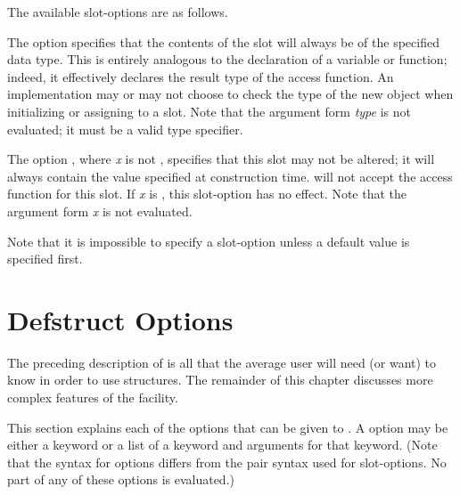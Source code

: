 The available slot-options are as follows.
\begin{flushdesc}
\item[\cd{:type}]
The option  specifies that the contents of the
slot will always be of the specified data type.  This is entirely
analogous to the declaration of a variable or function; indeed, it
effectively declares the result type of the access function.  An
implementation may or may not choose to check the type of the new object
when initializing or assigning to a slot.
Note that the argument form \emph{type} is not evaluated;
it must be a valid type specifier.

\item[\cd{:read-only}]
The option , where \emph{x} is not {\false},
specifies that this slot may not be
altered; it will always contain the value specified at construction time.
 will not accept the access function for this slot.
If \emph{x} is {\false}, this slot-option has no effect.
Note that the argument form \emph{x} is not evaluated.
\end{flushdesc}

Note that it is impossible to specify a slot-option unless
a default value is specified first.

\section{Defstruct Options}
\label{DEFSTRUCT-OPTIONS}
\label{Defstruct-Hairy-Stuff}

The preceding description of  is all that the average
user will need (or want) to know in order to use structures.
The remainder of this chapter discusses more complex features of
the  facility.

This section explains each of the options that can be given to .
A  option may be either a keyword
or a list of a keyword and arguments for that keyword.
(Note that the syntax for  options differs from
the pair syntax used for slot-options.  No part of any of these options
is evaluated.)

